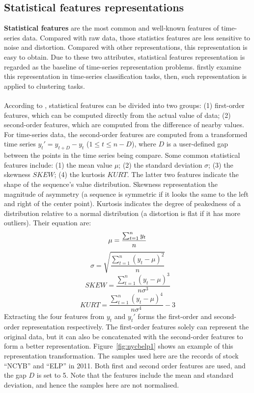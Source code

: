 \subsection{Statistical features representations}
\textbf{Statistical features} are the most common and well-known features of time-series data. Compared with raw data, those statistics features are less sensitive to noise and distortion. Compared with other representations, this representation is easy to obtain. Due to these two attributes, statistical features representation is regarded as the baseline of time-series representation problems. \cite{nanopoulos2001feature} firstly examine this representation in time-series classification tasks, then, such representation is applied to clustering tasks. \\
\\According to \cite{nanopoulos2001feature}, statistical features can be divided into two groups: (1) first-order features, which can be computed directly from the actual value of data; (2) second-order features, which are computed from the difference of nearby values. For time-series data, the second-order features are computed from a transformed time series $y_t\prime = y_{t+D} - y_t$ ($1 \le t \leq n-D$), where $D$ is a user-defined gap between the points in the time series being compare. Some common statistical features include: (1) the mean value $\mu$; (2) the standard deviation $\sigma$; (3) the skewness $SKEW$; (4) the kurtosis $KURT$. The latter two features indicate the shape of the sequence's value distribution. Skewness representation the magnitude of asymmetry (a sequence is symmetric if it looks the same to the left and right of the center point). Kurtosis indicates the degree of peakedness of a distribution relative to a normal distribution (a distortion is flat if it has more outliers). Their equation are:
\begin{equation} 
    \mu = \frac{\sum_{t=1}^n y_t}{n} \\
\end{equation}
\begin{equation} 
    \sigma = \sqrt{\frac{\sum_{t=1}^n (y_t - \mu)^2}{n}}
\end{equation}
\begin{equation}
    SKEW = \frac{\sum_{t=1}^n (y_t-\mu)^3}{n\sigma^3}
\end{equation}
\begin{equation} 
    KURT = \frac{\sum_{t=1}^n (y_t-\mu)^4}{n\sigma^4} - 3
\end{equation}
Extracting the four features from $y_t$ and $y_t\prime$ forms the first-order and second-order representation respectively. The first-order features solely can represent the original data, but it can also be concatenated with the second-order features to form a better representation. Figure~\ref{fig:nycbelp1} shows an example of this representation transformation. The samples used here are the records of stock ``NCYB'' and ``ELP'' in 2011. Both first and second order features are used, and the gap $D$ is set to 5. Note that the features include the mean and standard deviation, and hence the samples here are not normalised.
